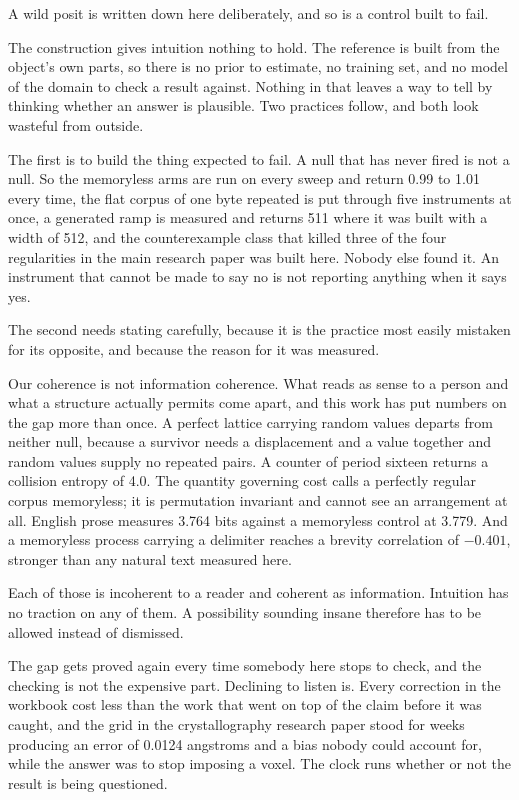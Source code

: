 A wild posit is written down here deliberately, and so is a control built to fail.

The construction gives intuition nothing to hold. The reference is built from the object's own parts,
so there is no prior to estimate, no training set, and no model of the domain to check a result
against. Nothing in that leaves a way to tell by thinking whether an answer is plausible. Two
practices follow, and both look wasteful from outside.

The first is to build the thing expected to fail. A null that has never fired is not a null. So the
memoryless arms are run on every sweep and return 0.99 to 1.01 every time, the flat corpus of one
byte repeated is put through five instruments at once, a generated ramp is measured and returns 511
where it was built with a width of 512, and the counterexample class that killed three of the four
regularities in the main research paper was built here. Nobody else found it. An instrument that
cannot be made to say no is not reporting anything when it says yes.

The second needs stating carefully, because it is the practice most easily mistaken for its opposite,
and because the reason for it was measured.

Our coherence is not information coherence. What reads as sense to a person and what a structure
actually permits come apart, and this work has put numbers on the gap more than once. A perfect
lattice carrying random values departs from neither null, because a survivor needs a displacement and
a value together and random values supply no repeated pairs. A counter of period sixteen returns a
collision entropy of 4.0. The quantity governing cost calls a perfectly regular corpus memoryless;
it is permutation invariant and cannot see an arrangement at all. English prose measures 3.764 bits
against a memoryless control at 3.779. And a memoryless process carrying a delimiter reaches a
brevity correlation of $-0.401$, stronger than any natural text measured here.

Each of those is incoherent to a reader and coherent as information. Intuition has no traction on any
of them. A possibility sounding insane therefore has to be allowed instead of dismissed.

The gap gets proved again every time somebody here stops to check, and the checking is not the
expensive part. Declining to listen is. Every correction in the workbook cost less than the work that
went on top of the claim before it was caught, and the grid in the crystallography research paper stood for
weeks producing an error of 0.0124 angstroms and a bias nobody could account for, while the answer
was to stop imposing a voxel. The clock runs whether or not the result is being questioned.

